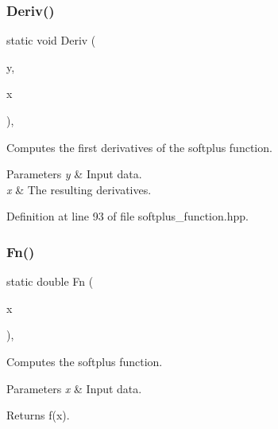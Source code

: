 \subsubsection{Deriv()\hspace{0.1cm}{\footnotesize\ttfamily [2/2]}}
{\footnotesize\ttfamily static void Deriv (\begin{DoxyParamCaption}\item[{const Input\+Type \&}]{y,  }\item[{Output\+Type \&}]{x }\end{DoxyParamCaption})\hspace{0.3cm}{\ttfamily [inline]}, {\ttfamily [static]}}



Computes the first derivatives of the softplus function. 


\begin{DoxyParams}{Parameters}
{\em y} & Input data. \\
\hline
{\em x} & The resulting derivatives. \\
\hline
\end{DoxyParams}


Definition at line 93 of file softplus\+\_\+function.\+hpp.

\mbox{\label{classmlpack_1_1ann_1_1SoftplusFunction_a11bd9a1195e6b107f9fee73643bc328b}} 
\subsubsection{Fn()\hspace{0.1cm}{\footnotesize\ttfamily [1/2]}}
{\footnotesize\ttfamily static double Fn (\begin{DoxyParamCaption}\item[{const double}]{x }\end{DoxyParamCaption})\hspace{0.3cm}{\ttfamily [inline]}, {\ttfamily [static]}}



Computes the softplus function. 


\begin{DoxyParams}{Parameters}
{\em x} & Input data. \\
\hline
\end{DoxyParams}
\begin{DoxyReturn}{Returns}
f(x). 
\end{DoxyReturn}


